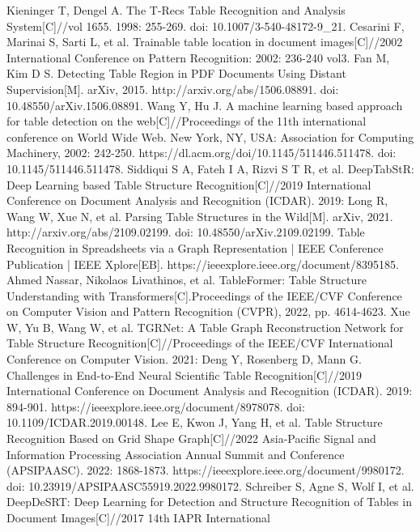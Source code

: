 \documentclass[UTF8,12pt, AutoFakeBold,fontset = founder]{ctexart}
\begin{document}
\begin{thebibliography}{00}
     Kieninger T, Dengel A. The T-Recs Table Recognition and
    Analysis System[C]//vol 1655. 1998: 255-269. doi: 10.1007/3-540-48172-9\_21.
     Cesarini F, Marinai S, Sarti L, et al. Trainable table location
    in document images[C]//2002 International Conference on Pattern Recognition: 2002: 236-240 vol3.
     Fan M, Kim D S. Detecting Table Region in PDF
    Documents Using Distant Supervision[M]. arXiv, 2015. http://arxiv.org/abs/1506.08891. doi: 10.48550/arXiv.1506.08891.
     Wang Y, Hu J. A machine learning based approach for table detection on the web[C]//Proceedings of the 11th
    international conference on World Wide Web. New York, NY, USA: Association for Computing Machinery, 2002: 242-250. https://dl.acm.org/doi/10.1145/511446.511478. doi: 10.1145/511446.511478.
     Siddiqui S A, Fateh I A, Rizvi S T R, et al. DeepTabStR: Deep Learning based Table Structure Recognition[C]//2019
    International Conference on Document Analysis and
    Recognition (ICDAR). 2019: 
     Long R, Wang W, Xue N, et al. Parsing Table Structures in
    the Wild[M]. arXiv, 2021. http://arxiv.org/abs/2109.02199. doi: 10.48550/arXiv.2109.02199.
     Table Recognition in Spreadsheets via a Graph Representation | IEEE Conference Publication | IEEE Xplore[EB]. https://ieeexplore.ieee.org/document/8395185.
     Ahmed Nassar, Nikolaos Livathinos, et al. TableFormer: Table Structure Understanding with Transformers[C].Proceedings of the IEEE/CVF Conference on Computer Vision and Pattern Recognition (CVPR), 2022, pp. 4614-4623.
     Xue W, Yu B, Wang W, et al. TGRNet: A Table Graph Reconstruction Network for Table Structure Recognition[C]//Proceedings of the IEEE/CVF International Conference on Computer Vision. 2021: 
     Deng Y, Rosenberg D, Mann G. Challenges in End-to-End Neural Scientific Table Recognition[C]//2019 International Conference on Document Analysis and Recognition (ICDAR). 2019: 894-901. https://ieeexplore.ieee.org/document/8978078. doi: 10.1109/ICDAR.2019.00148.
     Lee E, Kwon J, Yang H, et al. Table Structure Recognition Based on Grid Shape Graph[C]//2022 Asia-Pacific Signal and Information Processing Association Annual Summit and Conference (APSIPAASC). 2022: 1868-1873. https://ieeexplore.ieee.org/document/9980172. doi: 10.23919/APSIPAASC55919.2022.9980172.
     Schreiber S, Agne S, Wolf I, et al. DeepDeSRT: Deep
    Learning for Detection and Structure Recognition of Tables
    in Document Images[C]//2017 14th IAPR International

\end{thebibliography}
\end{document}
